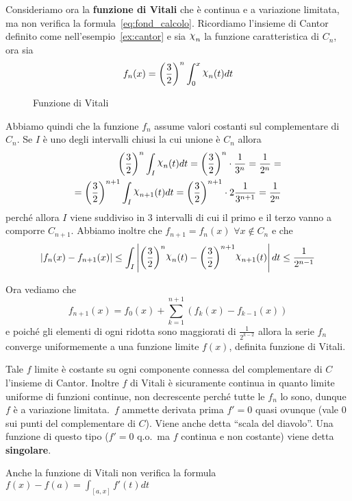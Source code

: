 Consideriamo ora la \textbf{funzione di Vitali} che è continua e a variazione
limitata, ma non verifica la formula~\eqref{eq:fond_calcolo}. Ricordiamo
l'insieme di Cantor definito come nell'esempio~\ref{ex:cantor} e sia \(\rchi_n\)
la funzione caratteristica di \(C_n\), ora sia
\[
    f_{n}{(x)} = {\left( \frac{3}{2} \right)} ^{n} \int_{0} ^{x}\rchi_n{(t)}dt
\]
\begin{figure}[ht]
    \centering
    \caption{Funzione di Vitali}\label{fig:funzione-cantor}
\end{figure}
Abbiamo quindi che la funzione \(f_{n}\) assume valori costanti sul
complementare di \(C_{n}\). Se \(I\) è uno degli intervalli chiusi la cui unione
è \(C_{n}\) allora
\begin{align*}
    {\left( \frac{3}{2} \right)} ^{n} \int_I \rchi_n{(t)}dt = {\left(
    \frac{3}{2} \right)} ^{n} \cdot \frac{1}{3^{n}} = \frac{1}{2^{n}} = \\
    = {\left( \frac{3}{2} \right)}^{n+1} \int_{I}  \rchi_{n+1}{(t)}dt = {\left(
    \frac{3}{2}\right)}^{n+1} \cdot 2 \frac{1}{3^{n+1}} = \frac{1}{2^{n}}
\end{align*}
perché allora \(I\) viene suddiviso in 3 intervalli di cui il primo e il terzo vanno
a comporre \(C_{n+1}\).
Abbiamo inoltre che \(f_{n+1} = f_{n}{(x)} \,\,\forall x \not\in C_{n}\) e che
\[
    |f_{n}{(x)} - f_{n+1} {(x)}| \le  \int_I \left| {\left( \frac{3}{2} \right)}
    ^{n} \rchi_n {(t)}  - {\left( \frac{3}{2} \right)} ^{n+1} \rchi_{n+1}
    {(t)}\right| dt \le \frac{1}{2^{n-1}}
\]

Ora vediamo che
\[
    f_{n+1} {(x)} = f_{0} {(x)} + \sum_{k=1}^{n+1} {\left( f_k{(x)} - f_{k-1}
    {(x)} \right)}  
\]
e poiché gli elementi di ogni ridotta sono maggiorati di \(\frac{1}{2^{k-2}}\)
allora la serie \(f_{n}\) converge uniformemente a una funzione limite
\(f{(x)}\), definita funzione di Vitali.

Tale \(f\) limite è costante su ogni componente connessa del complementare di \(C\)
l'insieme di Cantor. Inoltre \(f\) di Vitali è sicuramente continua in quanto
limite uniforme di funzioni continue, non decrescente perché tutte le \(f_{n}\)
lo sono, dunque \(f\) è a variazione limitata.~\(f\) ammette derivata prima \(f'
= 0\) quasi ovunque (vale 0 sui punti del complementare di  \(C\)). Viene anche
detta ``scala del diavolo''. Una funzione di questo tipo (\(f'=0\) q.o.~ma \(f\)
continua e non costante) viene detta \textbf{singolare}.
\begin{note}
    Anche la funzione di Vitali non verifica la formula \(f{(x)} - f{(a)} =
    \int_{[a,x]} f'{(t)} dt\) 
\end{note}

